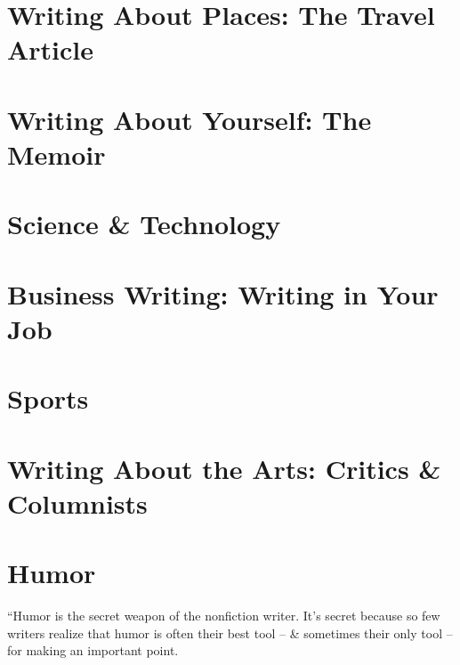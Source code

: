 \documentclass{article}
\numberwithin{equation}{section}
\begin{document}
\section{Writing About Places: The Travel Article}


\section{Writing About Yourself: The Memoir}


\section{Science \& Technology}


\section{Business Writing: Writing in Your Job}


\section{Sports}


\section{Writing About the Arts: Critics \& Columnists}


\section{Humor}
``Humor is the secret weapon of the nonfiction writer. It's secret because so few writers realize that humor is often their best tool -- \& sometimes their only tool -- for making an important point.
\end{document}
